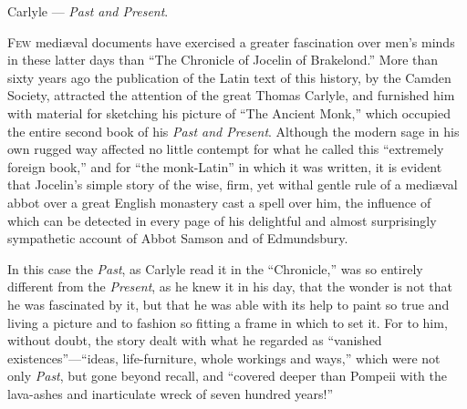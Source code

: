 \documentclass[10pt]{book}
\begin{document}
{\begin{center}
{\hspace{0pt}\hfill Carlyle --- \emph{Past and Present}.
}

\end{center}

\vspace{1cm}

{

\lettrine[lines=4]{\color{BrickRed}F}{ew} medi\ae{}val documents have exercised a greater fascination over men's minds in these latter days than ``The Chronicle of Jocelin of Brakelond.'' More than sixty years ago the publication of the Latin text of this history, by the Camden Society, attracted the attention of the great Thomas Carlyle, and furnished him with material for sketching his picture of ``The Ancient Monk,'' which occupied the entire second book of his \emph{Past and Present}. Although the modern sage in his own rugged way affected no little contempt for what he called this ``extremely foreign book,'' and for ``the monk-Latin'' in which it was written, it is evident that Jocelin's simple story of the wise, firm, yet withal gentle rule of a medi\ae{}val abbot over a great English monastery cast a spell over him, the influence of which can be detected in every page of his delightful and almost surprisingly sympathetic account of Abbot Samson and of Edmundsbury.

In this case the \emph{Past}, as Carlyle read it in the ``Chronicle,'' was so entirely different from the \emph{Present}, as he knew it in his day, that the wonder is not that he was fascinated by it, but that he was able with its help to paint so true and living a picture and to fashion so fitting a frame in which to set it. For to him, without doubt, the story dealt with what he regarded as ``vanished existences''---``ideas, life-furniture, whole workings and ways,'' which were not only \emph{Past}, but gone beyond recall, and ``covered deeper than Pompeii with the lava-ashes and inarticulate wreck of seven hundred years!''

}}
\end{document}
